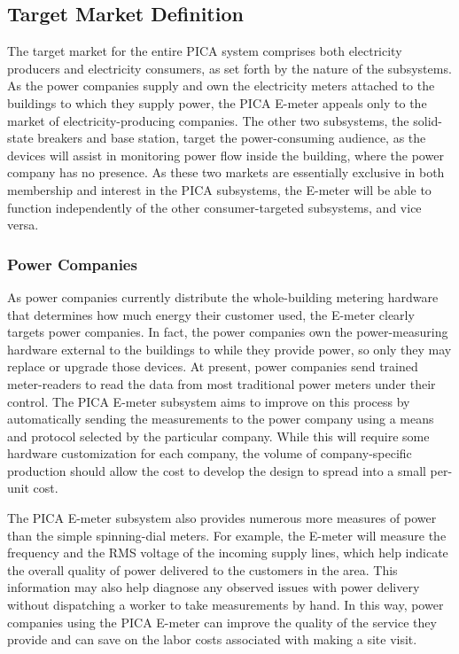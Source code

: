 \subsection{Target Market Definition} %
The target market for the entire PICA system comprises both electricity producers and electricity consumers, as set forth by the nature of the subsystems. As the power companies supply and own the electricity meters attached to the buildings to which they supply power, the PICA E-meter appeals only to the market of electricity-producing companies. The other two subsystems, the solid-state breakers and base station, target the power-consuming audience, as the devices will assist in monitoring power flow inside the building, where the power company has no presence. As these two markets are essentially exclusive in both membership and interest in the PICA subsystems, the E-meter will be able to function independently of the other consumer-targeted subsystems, and vice versa.

\subsubsection{Power Companies} %
As power companies currently distribute the whole-building metering hardware that determines how much energy their customer used, the E-meter clearly targets power companies. In fact, the power companies own the power-measuring hardware external to the buildings to while they provide power, so only they may replace or upgrade those devices. At present, power companies send trained meter-readers to read the data from most traditional power meters under their control. The PICA E-meter subsystem aims to improve on this process by automatically sending the measurements to the power company using a means and protocol selected by the particular company. While this will require some hardware customization for each company, the volume of company-specific production should allow the cost to develop the design to spread into a small per-unit cost.

The PICA E-meter subsystem also provides numerous more measures of power than the simple spinning-dial meters. For example, the E-meter will measure the frequency and the RMS voltage of the incoming supply lines, which help indicate the overall quality of power delivered to the customers in the area. This information may also help diagnose any observed issues with power delivery without dispatching a worker to take measurements by hand. In this way, power companies using the PICA E-meter can improve the quality of the service they provide and can save on the labor costs associated with making a site visit.

